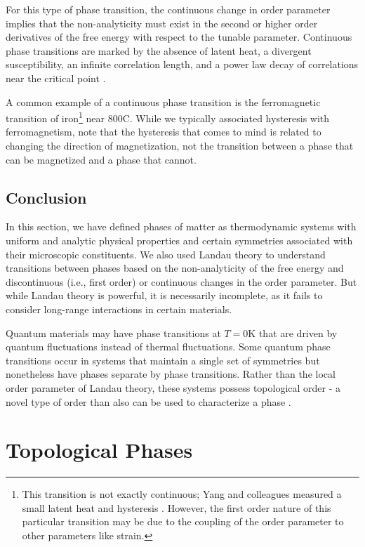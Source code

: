 For this type of phase transition, the continuous change in order parameter implies that the non-analyticity must exist in the second or higher order derivatives of the free energy with respect to the tunable parameter. Continuous phase transitions are marked by the absence of latent heat, a divergent susceptibility, an infinite correlation length, and a power law decay of correlations near the critical point \cite{Cardy1996}.

A common example of a continuous phase transition is the ferromagnetic transition of iron\footnote{This transition is not exactly continuous; Yang and colleagues measured a small latent heat and hysteresis \cite{Yang2008}. However, the first order nature of this particular transition may be due to the coupling of the order parameter to other parameters like strain.} near 800\degree C. While we typically associated hysteresis with ferromagnetism, note that the hysteresis that comes to mind is related to changing the direction of magnetization, not the transition between a phase that can be magnetized and a phase that cannot. 

\subsection{Conclusion}
In this section, we have defined phases of matter as thermodynamic systems with uniform and analytic physical properties and certain symmetries associated with their microscopic constituents. We also used Landau theory to understand transitions between phases based on the non-analyticity of the free energy and discontinuous (i.e., first order) or continuous changes in the order parameter. But while Landau theory is powerful, it is necessarily incomplete, as it fails to consider long-range interactions in certain materials.

Quantum materials may have phase transitions at $T = 0$K that are driven by quantum fluctuations instead of thermal fluctuations. Some quantum phase transitions occur in systems that maintain a single set of symmetries but nonetheless have phases separate by phase transitions. Rather than the local order parameter of Landau theory, these systems possess topological order - a novel type of order than also can be used to characterize a phase \cite{Wen1990}.

\section{Topological Phases}

